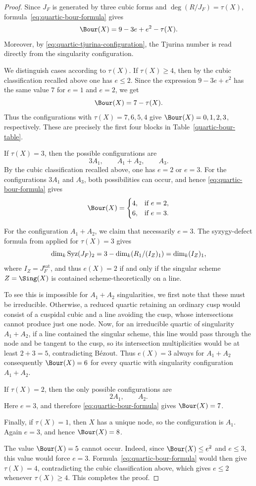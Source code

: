 \documentclass[11pt]{amsart} %
\theoremstyle{definition}
\def\syz{\mbox{\rm Syz}}
\begin{document}
\begin{proof}
Since $J_F$ is generated by three cubic forms and $\deg(R/J_F)=\tau(X)$, formula~\eqref{eq:quartic-bour-formula} gives
\[
\Bour(X)=9-3e+e^2-\tau(X).
\]
Moreover, by \eqref{eq:quartic-tjurina-configuration}, the Tjurina number is read directly from the singularity configuration.

We distinguish cases according to $\tau(X)$. If $\tau(X)\geq 4$, then by the cubic classification recalled above one has $e\leq 2$. Since the expression $9-3e+e^2$ has the same value $7$ for $e=1$ and $e=2$, we get
\[
\Bour(X)=7-\tau(X).
\]
Thus the configurations with $\tau(X)=7,6,5,4$ give $\Bour(X)=0,1,2,3$, respectively. These are precisely the first four blocks in Table~\ref{quartic-bour-table}.

If $\tau(X)=3$, then the possible configurations are
\[
3A_1,\qquad A_1+A_2,\qquad A_3.
\]
By the cubic classification recalled above, one has $e=2$ or $e=3$.
For the configurations $3A_1$ and $A_3$, both possibilities can occur,
and hence \eqref{eq:quartic-bour-formula} gives
\[
\Bour(X)=
\begin{cases}
4, & \text{if } e=2,\\
6, & \text{if } e=3.
\end{cases}
\]

For the configuration $A_1+A_2$, we claim that necessarily $e=3$. The syzygy-defect formula from \cite[Theorem 1]{dimca2013syzygies} applied for $\tau(X) = 3$ gives
$$
\dim_k \syz(J_F)_2 = 3 - \dim_k(R_1/(I_Z)_1) = \dim_k (I_Z)_1,
$$
where $I_Z = J_F^{\text{sat}}$, and thus $e(X) = 2$ if and only if the singular scheme $Z = \Sing(X)$ is contained scheme-theoretically on a line. 

To see this is impossible for $A_1 + A_2$ singularities, we first note that these must be irreducible. Otherwise, a reduced quartic retaining an ordinary cusp would consist of a cuspidal cubic and a line avoiding the cusp, whose intersections cannot produce just one node. Now, for an irreducible quartic of singularity $A_1 + A_2$, if a line contained the singular scheme, this line would pass through the node and be tangent to the cusp, so its intersection multiplicities would be at least $2 + 3 = 5$, contradicting Bézout. Thus $e(X) = 3$ always for $A_1 + A_2$
consequently $\Bour(X)=6$ for every quartic with singularity configuration $A_1+A_2$.

If $\tau(X)=2$, then the only possible configurations are
\[
2A_1,\qquad A_2.
\]
Here $e=3$, and therefore \eqref{eq:quartic-bour-formula} gives $\Bour(X)=7$.

Finally, if $\tau(X)=1$, then $X$ has a unique node, so the configuration is $A_1$. Again $e=3$, and hence $\Bour(X)=8$.

The value $\Bour(X)=5$ cannot occur. Indeed, since
$\Bour(X)\leq e^2$ and $e\leq3$, this value would force $e=3$.
Formula~\eqref{eq:quartic-bour-formula} would then give
$\tau(X)=4$, contradicting the cubic classification above, which gives
$e\leq2$ whenever $\tau(X)\geq4$. This completes the proof.
\end{proof}
\end{document}

